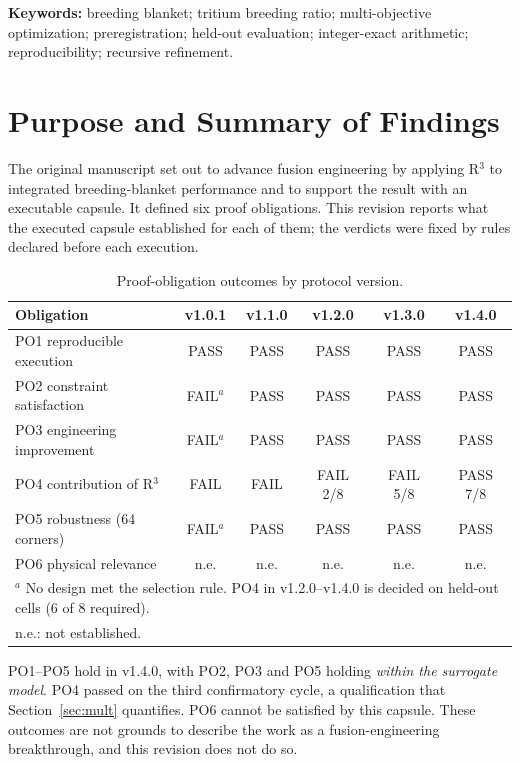 \documentclass[11pt]{article}
\begin{document}
\noindent\textbf{Keywords:} breeding blanket; tritium breeding ratio; multi-objective optimization;
preregistration; held-out evaluation; integer-exact arithmetic; reproducibility; recursive refinement.

\section{Purpose and Summary of Findings}

The original manuscript set out to advance fusion engineering by applying R$^3$ to integrated
breeding-blanket performance and to support the result with an executable capsule. It defined
six proof obligations. This revision reports what the executed capsule established for each
of them; the verdicts were fixed by rules declared before each execution.

\begin{table}[h]
\centering
\caption{Proof-obligation outcomes by protocol version.}
\label{tab:po}
\begin{tabular}{lccccc}
\toprule
Obligation & v1.0.1 & v1.1.0 & v1.2.0 & v1.3.0 & v1.4.0 \\
\midrule
PO1 reproducible execution & PASS & PASS & PASS & PASS & PASS \\
PO2 constraint satisfaction & FAIL$^a$ & PASS & PASS & PASS & PASS \\
PO3 engineering improvement & FAIL$^a$ & PASS & PASS & PASS & PASS \\
PO4 contribution of R$^3$ & FAIL & FAIL & FAIL 2/8 & FAIL 5/8 & PASS 7/8 \\
PO5 robustness (64 corners) & FAIL$^a$ & PASS & PASS & PASS & PASS \\
PO6 physical relevance & n.e. & n.e. & n.e. & n.e. & n.e. \\
\bottomrule
\multicolumn{6}{l}{\footnotesize $^a$ No design met the selection rule. PO4 in v1.2.0--v1.4.0 is decided on held-out cells (6 of 8 required).}\\
\multicolumn{6}{l}{\footnotesize n.e.: not established.}
\end{tabular}
\end{table}

PO1--PO5 hold in v1.4.0, with PO2, PO3 and PO5 holding \emph{within the surrogate model}. PO4 passed
on the third confirmatory cycle, a qualification that Section~\ref{sec:mult} quantifies. PO6 cannot be
satisfied by this capsule. These outcomes are not grounds to describe the work as a
fusion-engineering breakthrough, and this revision does not do so.
\end{document}
